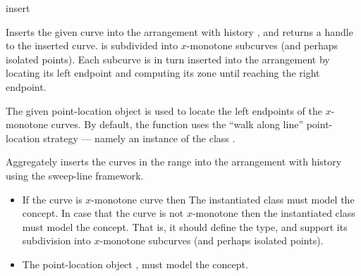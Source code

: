 \begin{ccRefFunction}{insert}



Inserts the given curve  into the arrangement with history ,
and returns a handle to the inserted curve.  is subdivided into
$x$-monotone subcurves (and perhaps isolated points). Each subcurve is in
turn inserted into the arrangement by locating its left endpoint and
computing its zone until reaching the right endpoint.

The given point-location object  is used to locate the left
endpoints of the $x$-monotone curves. By default, the function uses the
``walk along line'' point-location strategy --- namely an instance of
the class .



Aggregately inserts the curves in the range \ccc{[first,last)} into the
arrangement with history  using the sweep-line framework.


\ccRequirements
\begin{itemize}
\item If the curve is $x$-monotone curve then The instantiated
   class must model the 
  concept. In case that the curve is not $x$-monotone then the
  instantiated  class must model the
   concept. That is, it should define the
   type, and support its subdivision into $x$-monotone
  subcurves (and perhaps isolated points). 
\item The point-location object , must model the
   concept.
\end{itemize}

\end{ccRefFunction}

\ccRefPageEnd
